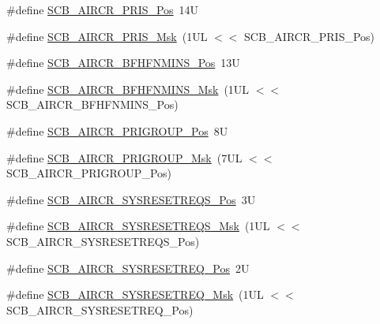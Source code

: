 \begin{DoxyCompactItemize}
\item 
\#define \mbox{\hyperlink{group___c_m_s_i_s___s_c_b_ga2590e227eedb35a41044d8fb7feb9037}{S\+C\+B\+\_\+\+A\+I\+R\+C\+R\+\_\+\+P\+R\+I\+S\+\_\+\+Pos}}~14U
\item 
\#define \mbox{\hyperlink{group___c_m_s_i_s___s_c_b_ga0032bb51f38e103fc34c2a57e59ada6f}{S\+C\+B\+\_\+\+A\+I\+R\+C\+R\+\_\+\+P\+R\+I\+S\+\_\+\+Msk}}~(1\+U\+L $<$$<$ S\+C\+B\+\_\+\+A\+I\+R\+C\+R\+\_\+\+P\+R\+I\+S\+\_\+\+Pos)
\item 
\#define \mbox{\hyperlink{group___c_m_s_i_s___s_c_b_ga94e2fc10be4f6065dcb5a7276b40d933}{S\+C\+B\+\_\+\+A\+I\+R\+C\+R\+\_\+\+B\+F\+H\+F\+N\+M\+I\+N\+S\+\_\+\+Pos}}~13U
\item 
\#define \mbox{\hyperlink{group___c_m_s_i_s___s_c_b_gabc24019f3b54b8d2acd23016b2e0c7b9}{S\+C\+B\+\_\+\+A\+I\+R\+C\+R\+\_\+\+B\+F\+H\+F\+N\+M\+I\+N\+S\+\_\+\+Msk}}~(1\+U\+L $<$$<$ S\+C\+B\+\_\+\+A\+I\+R\+C\+R\+\_\+\+B\+F\+H\+F\+N\+M\+I\+N\+S\+\_\+\+Pos)
\item 
\#define \mbox{\hyperlink{group___c_m_s_i_s___s_c_b_gaca155deccdeca0f2c76b8100d24196c8}{S\+C\+B\+\_\+\+A\+I\+R\+C\+R\+\_\+\+P\+R\+I\+G\+R\+O\+U\+P\+\_\+\+Pos}}~8U
\item 
\#define \mbox{\hyperlink{group___c_m_s_i_s___s_c_b_ga8be60fff03f48d0d345868060dc6dae7}{S\+C\+B\+\_\+\+A\+I\+R\+C\+R\+\_\+\+P\+R\+I\+G\+R\+O\+U\+P\+\_\+\+Msk}}~(7\+U\+L $<$$<$ S\+C\+B\+\_\+\+A\+I\+R\+C\+R\+\_\+\+P\+R\+I\+G\+R\+O\+U\+P\+\_\+\+Pos)
\item 
\#define \mbox{\hyperlink{group___c_m_s_i_s___s_c_b_ga7e6b3da07caee0726c5aab97ecebc2a5}{S\+C\+B\+\_\+\+A\+I\+R\+C\+R\+\_\+\+S\+Y\+S\+R\+E\+S\+E\+T\+R\+E\+Q\+S\+\_\+\+Pos}}~3U
\item 
\#define \mbox{\hyperlink{group___c_m_s_i_s___s_c_b_gaf4b7fe06aaa2e87cdaf25a720dd282a1}{S\+C\+B\+\_\+\+A\+I\+R\+C\+R\+\_\+\+S\+Y\+S\+R\+E\+S\+E\+T\+R\+E\+Q\+S\+\_\+\+Msk}}~(1\+U\+L $<$$<$ S\+C\+B\+\_\+\+A\+I\+R\+C\+R\+\_\+\+S\+Y\+S\+R\+E\+S\+E\+T\+R\+E\+Q\+S\+\_\+\+Pos)
\item 
\#define \mbox{\hyperlink{group___c_m_s_i_s___s_c_b_gaffb2737eca1eac0fc1c282a76a40953c}{S\+C\+B\+\_\+\+A\+I\+R\+C\+R\+\_\+\+S\+Y\+S\+R\+E\+S\+E\+T\+R\+E\+Q\+\_\+\+Pos}}~2U
\item 
\#define \mbox{\hyperlink{group___c_m_s_i_s___s_c_b_gaae1181119559a5bd36e62afa373fa720}{S\+C\+B\+\_\+\+A\+I\+R\+C\+R\+\_\+\+S\+Y\+S\+R\+E\+S\+E\+T\+R\+E\+Q\+\_\+\+Msk}}~(1\+U\+L $<$$<$ S\+C\+B\+\_\+\+A\+I\+R\+C\+R\+\_\+\+S\+Y\+S\+R\+E\+S\+E\+T\+R\+E\+Q\+\_\+\+Pos)
\item 
$$
\end{DoxyCompactItemize}
